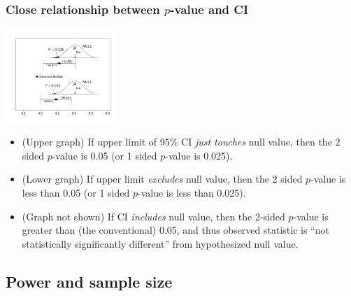 \documentclass[10pt]{beamer}\usepackage[]{graphicx}\usepackage[]{color}
\begin{document}
\begin{frame}
	\frametitle{Close relationship between $p$-value and CI}
	\begin{center}
		\includegraphics[width=1.65in]{P-CI.pdf}
	\end{center} 
	\begin{footnotesize}
		\begin{itemize}
			\item
			(Upper graph) If upper limit of 95\% CI\textit{ just touches} null value, then
			the 2 sided $p$-value is 0.05 (or 1 sided $p$-value is 0.025). 
			\item
			(Lower graph) If upper limit \textit{excludes} null value, then
			the 2 sided $p$-value is less than 0.05 (or 1 sided $p$-value is less than 0.025). 
			\item
			(Graph not shown) If  CI \textit{includes} null value, then the 2-sided $p$-value is greater than (the conventional) 0.05, and thus observed statistic is ``not statistically significantly different'' from hypothesized null value. 
		\end{itemize}
	\end{footnotesize}
\end{frame}


\subsection{Power and sample size}
\end{document}
